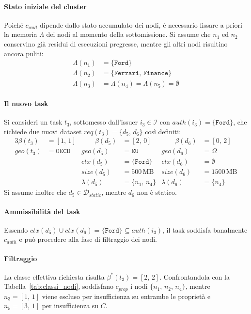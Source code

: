 \paragraph{Stato iniziale del cluster} Poiché $c_{wall}$ dipende dallo stato accumulato dei nodi, è necessario fissare a priori la memoria $\Lambda$ dei nodi al momento della sottomissione. Si assume che $n_1$ ed $n_2$ conservino già residui di esecuzioni pregresse, mentre gli altri nodi risultino ancora puliti:
\begin{align}
    \Lambda(n_1) &= \{\mathtt{Ford}\} \\
    \Lambda(n_2) &= \{\mathtt{Ferrari},\, \mathtt{Finance}\} \\
    \Lambda(n_3) &= \Lambda(n_4) = \Lambda(n_5) = \emptyset
\end{align}

\paragraph{Il nuovo task} Si consideri un task $t_3$, sottomesso dall'issuer $i_3 \in \mathcal{I}$ con $auth(i_3) = \{\mathtt{Ford}\}$, che richiede due nuovi dataset $req(t_3) = \{d_5,\, d_6\}$ così definiti:
\begin{alignat}{3}
    \beta(t_3) &= [1,\, 1]      &\qquad \beta(d_5)   &= [2,\, 0]          &\qquad \beta(d_6)   &= [0,\, 2] \\
    geo(t_3)   &= \mathtt{OECD} &       geo(d_5)     &= \mathtt{EU}       &       geo(d_6)     &= \Omega \\
               &                &       ctx(d_5)     &= \{\mathtt{Ford}\} &       ctx(d_6)     &= \emptyset \\
               &                &       size(d_5)    &= 500\,\text{MB}    &       size(d_6)    &= 1500\,\text{MB} \\
               &                &       \lambda(d_5) &= \{n_1,\, n_4\}    &       \lambda(d_6) &= \{n_4\}
\end{alignat}
Si assume inoltre che $d_5 \in \mathcal{D}_{static}$, mentre $d_6$ non è statico.

\paragraph{Ammissibilità del task} Essendo $ctx(d_5) \cup ctx(d_6) = \{\mathtt{Ford}\} \subseteq auth(i_3)$, il task soddisfa banalmente $c_{auth}$ e può procedere alla fase di filtraggio dei nodi.

\paragraph{Filtraggio} La classe effettiva richiesta risulta $\beta^*(t_3) = [2,\, 2]$. Confrontandola con la Tabella~\ref{tab:classi_nodi}, soddisfano $c_{prop}$ i nodi $\{n_1,\, n_2,\, n_4\}$, mentre $n_3 = [1,\,1]$ viene escluso per insufficienza su entrambe le proprietà e $n_5 = [3,\,1]$ per insufficienza su $C$. 

